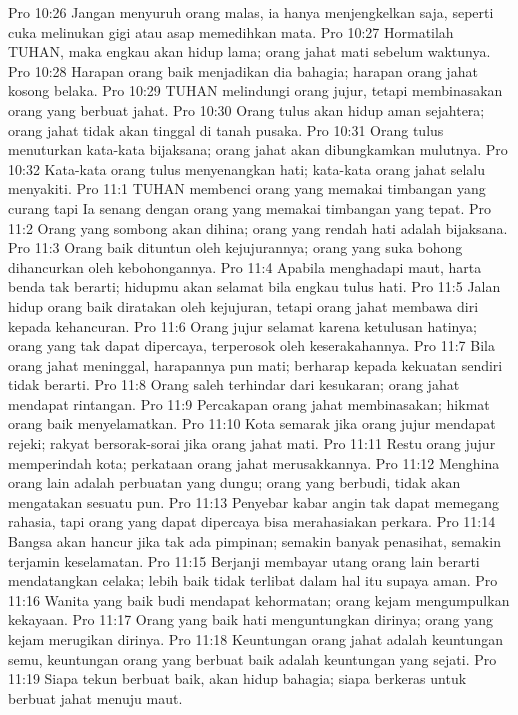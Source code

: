 Pro 10:26  Jangan menyuruh orang malas, ia hanya menjengkelkan saja, seperti cuka melinukan gigi atau asap memedihkan mata.
Pro 10:27  Hormatilah TUHAN, maka engkau akan hidup lama; orang jahat mati sebelum waktunya.
Pro 10:28  Harapan orang baik menjadikan dia bahagia; harapan orang jahat kosong belaka.
Pro 10:29  TUHAN melindungi orang jujur, tetapi membinasakan orang yang berbuat jahat.
Pro 10:30  Orang tulus akan hidup aman sejahtera; orang jahat tidak akan tinggal di tanah pusaka.
Pro 10:31  Orang tulus menuturkan kata-kata bijaksana; orang jahat akan dibungkamkan mulutnya.
Pro 10:32  Kata-kata orang tulus menyenangkan hati; kata-kata orang jahat selalu menyakiti.
Pro 11:1  TUHAN membenci orang yang memakai timbangan yang curang tapi Ia senang dengan orang yang memakai timbangan yang tepat.
Pro 11:2  Orang yang sombong akan dihina; orang yang rendah hati adalah bijaksana.
Pro 11:3  Orang baik dituntun oleh kejujurannya; orang yang suka bohong dihancurkan oleh kebohongannya.
Pro 11:4  Apabila menghadapi maut, harta benda tak berarti; hidupmu akan selamat bila engkau tulus hati.
Pro 11:5  Jalan hidup orang baik diratakan oleh kejujuran, tetapi orang jahat membawa diri kepada kehancuran.
Pro 11:6  Orang jujur selamat karena ketulusan hatinya; orang yang tak dapat dipercaya, terperosok oleh keserakahannya.
Pro 11:7  Bila orang jahat meninggal, harapannya pun mati; berharap kepada kekuatan sendiri tidak berarti.
Pro 11:8  Orang saleh terhindar dari kesukaran; orang jahat mendapat rintangan.
Pro 11:9  Percakapan orang jahat membinasakan; hikmat orang baik menyelamatkan.
Pro 11:10  Kota semarak jika orang jujur mendapat rejeki; rakyat bersorak-sorai jika orang jahat mati.
Pro 11:11  Restu orang jujur memperindah kota; perkataan orang jahat merusakkannya.
Pro 11:12  Menghina orang lain adalah perbuatan yang dungu; orang yang berbudi, tidak akan mengatakan sesuatu pun.
Pro 11:13  Penyebar kabar angin tak dapat memegang rahasia, tapi orang yang dapat dipercaya bisa merahasiakan perkara.
Pro 11:14  Bangsa akan hancur jika tak ada pimpinan; semakin banyak penasihat, semakin terjamin keselamatan.
Pro 11:15  Berjanji membayar utang orang lain berarti mendatangkan celaka; lebih baik tidak terlibat dalam hal itu supaya aman.
Pro 11:16  Wanita yang baik budi mendapat kehormatan; orang kejam mengumpulkan kekayaan.
Pro 11:17  Orang yang baik hati menguntungkan dirinya; orang yang kejam merugikan dirinya.
Pro 11:18  Keuntungan orang jahat adalah keuntungan semu, keuntungan orang yang berbuat baik adalah keuntungan yang sejati.
Pro 11:19  Siapa tekun berbuat baik, akan hidup bahagia; siapa berkeras untuk berbuat jahat menuju maut.
